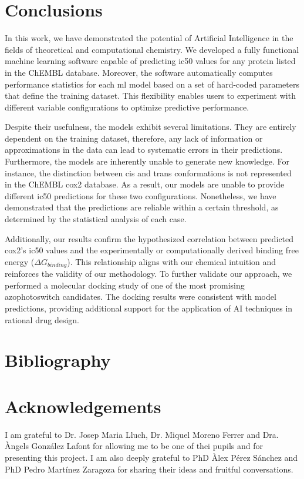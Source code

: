 \documentclass[11pt]{article}
\begin{document}
\newpage
\section{Conclusions}

In this work, we have demonstrated the potential of Artificial Intelligence in the fields of theoretical and computational chemistry. We developed a fully functional machine learning software capable of predicting \gls{ic50} values for any protein listed in the ChEMBL database. Moreover, the software automatically computes performance statistics for each \gls{ml} model based on a set of hard-coded parameters that define the training dataset. This flexibility enables users to experiment with different variable configurations to optimize predictive performance.

Despite their usefulness, the models exhibit several limitations. They are entirely dependent on the training dataset, therefore, any lack of information or approximations in the data can lead to systematic errors in their predictions. Furthermore, the models are inherently unable to generate new knowledge. For instance, the distinction between cis and trans conformations is not represented in the ChEMBL \gls{cox2} database. As a result, our models are unable to provide different \gls{ic50} predictions for these two configurations. Nonetheless, we have demonstrated that the predictions are reliable within a certain threshold, as determined by the statistical analysis of each case.

Additionally, our results confirm the hypothesized correlation between predicted \gls{cox2}'s \gls{ic50} values and the experimentally or computationally derived binding free energy ($\Delta G_{binding}$). This relationship aligns with our chemical intuition and reinforces the validity of our methodology. To further validate our approach, we performed a molecular docking study of one of the most promising azophotoswitch candidates. The docking results were consistent with model predictions, providing additional support for the application of AI techniques in rational drug design.

\newpage
\section{Bibliography}
\printbibliography[title = { \vspace{-1cm}}]

\newpage
\section{Acknowledgements}
I am grateful to Dr. Josep Maria Lluch, Dr. Miquel Moreno Ferrer and Dra. Àngels González Lafont for allowing me to be one of thei pupils and for presenting this project. I am also deeply grateful to PhD Àlex Pérez Sánchez and PhD Pedro Martínez Zaragoza for sharing their ideas and fruitful conversations.
\end{document}
